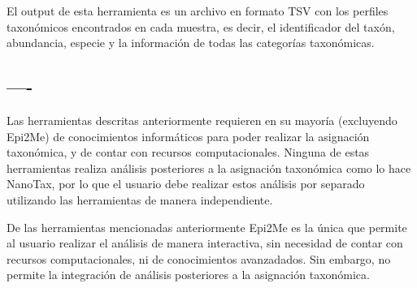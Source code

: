 El output de esta herramienta es un archivo en formato TSV con los perfiles taxonómicos encontrados en cada muestra, es decir, el identificador del taxón, abundancia, especie y la información de todas las categorías taxonómicas. 


\subsection{----}
Las herramientas descritas anteriormente requieren en su mayoría (excluyendo Epi2Me) de conocimientos informáticos para poder realizar la asignación taxonómica, y de contar con recursos computacionales.
Ninguna de estas herramientas realiza análisis posteriores a la asignación taxonómica como lo hace NanoTax, por lo que el usuario debe realizar estos análisis por separado utilizando las herramientas de manera independiente.

De las herramientas mencionadas anteriormente Epi2Me es la única que permite al usuario realizar el análisis de manera interactiva, sin necesidad de contar con recursos computacionales, ni de conocimientos avanzadados. 
Sin embargo, no permite la integración de análisis posteriores a la asignación taxonómica.